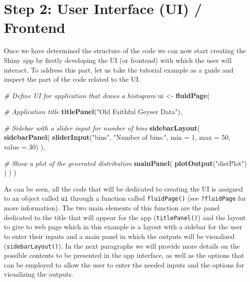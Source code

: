 \documentclass[12pt,]{krantz}
\newenvironment{Shaded}{\begin{snugshade}}{\end{snugshade}}
\newcommand{\KeywordTok}[1]{\textcolor[rgb]{0.27,0.27,0.27}{\textbf{#1}}}
\newcommand{\DataTypeTok}[1]{\textcolor[rgb]{0.27,0.27,0.27}{#1}}
\newcommand{\DecValTok}[1]{\textcolor[rgb]{0.06,0.06,0.06}{#1}}
\newcommand{\StringTok}[1]{\textcolor[rgb]{0.5,0.5,0.5}{#1}}
\newcommand{\CommentTok}[1]{\textcolor[rgb]{0.37,0.37,0.37}{\textit{#1}}}
\newcommand{\NormalTok}[1]{#1}
\begin{document}
\section{Step 2: User Interface (UI) /
Frontend}\label{step-2-user-interface-ui-frontend}

Once we have determined the structure of the code we can now start
creating the Shiny app by firstly developing the UI (or frontend) with
which the user will interact. To address this part, let us take the
tutorial example as a guide and inspect the part of the code related to
the UI.

\begin{Shaded}
\begin{Highlighting}[]
\CommentTok{# Define UI for application that draws a histogram}
\NormalTok{ui <-}\StringTok{ }\KeywordTok{fluidPage}\NormalTok{(}
   
   \CommentTok{# Application title}
   \KeywordTok{titlePanel}\NormalTok{(}\StringTok{"Old Faithful Geyser Data"}\NormalTok{),}
   
   \CommentTok{# Sidebar with a slider input for number of bins }
   \KeywordTok{sidebarLayout}\NormalTok{(}
      \KeywordTok{sidebarPanel}\NormalTok{(}
         \KeywordTok{sliderInput}\NormalTok{(}\StringTok{"bins"}\NormalTok{,}
                     \StringTok{"Number of bins:"}\NormalTok{,}
                     \DataTypeTok{min =} \DecValTok{1}\NormalTok{,}
                     \DataTypeTok{max =} \DecValTok{50}\NormalTok{,}
                     \DataTypeTok{value =} \DecValTok{30}\NormalTok{)}
\NormalTok{      ),}
      
      \CommentTok{# Show a plot of the generated distribution}
      \KeywordTok{mainPanel}\NormalTok{(}
         \KeywordTok{plotOutput}\NormalTok{(}\StringTok{"distPlot"}\NormalTok{)}
\NormalTok{      )}
\NormalTok{   )}
\NormalTok{)}
\end{Highlighting}
\end{Shaded}

As can be seen, all the code that will be dedicated to creating the UI
is assigned to an object called \texttt{ui} through a function called
\texttt{fluidPage()} (see \texttt{?fluidPage} for more information). The
two main elements of this function are the panel dedicated to the title
that will appear for the app (\texttt{titlePanel()}) and the layout to
give to web page which in this example is a layout with a sidebar for
the user to enter their inputs and a main panel in which the outputs
will be visualized (\texttt{sidebarLayout()}). In the next paragraphs we
will provide more details on the possible contents to be presented in
the app interface, as well as the options that can be employed to allow
the user to enter the needed inputs and the options for visualizing the
outputs.
\end{document}
